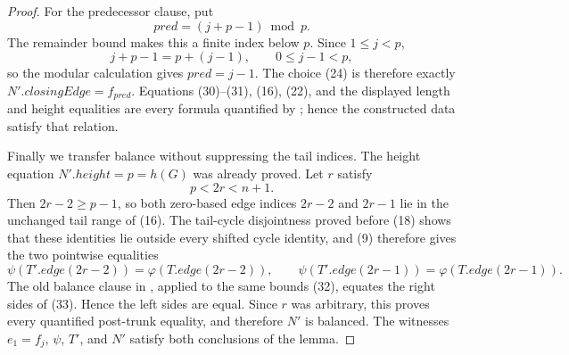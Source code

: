\begin{proof}
For the predecessor clause, put
\[
                   pred=(j+p-1)\bmod p.                          \tag{31}
\]
The remainder bound makes this a finite index below $p$.  Since
$1\leq j<p$,
\[
      j+p-1=p+(j-1),\qquad 0\leq j-1<p,
\]
so the modular calculation gives $pred=j-1$.  The choice (24) is therefore
exactly $N'.closingEdge=f_{pred}$.  Equations (30)--(31), (16), (22), and
the displayed length and height equalities are every formula quantified
by ; hence the constructed data satisfy that
relation.

Finally we transfer balance without suppressing the tail indices.  The
height equation $N'.height=p=h(G)$ was already proved.  Let $r$ satisfy
\[
                         p<2r<n+1.                               \tag{32}
\]
Then $2r-2\geq p-1$, so both zero-based edge indices $2r-2$ and $2r-1$
lie in the unchanged tail range of (16).  The tail-cycle disjointness
proved before (18) shows that these identities lie outside every shifted
cycle identity, and (9) therefore gives the two pointwise equalities
\[
 \psi(T'.edge(2r-2))=\varphi(T.edge(2r-2)),\qquad
 \psi(T'.edge(2r-1))=\varphi(T.edge(2r-1)).                      \tag{33}
\]
The old balance clause in
, applied to the same bounds (32),
equates the right sides of (33).  Hence the left sides are equal.  Since
$r$ was arbitrary, this proves every quantified post-trunk equality, and
therefore $N'$ is balanced.  The witnesses $e_1=f_j$, $\psi$, $T'$, and
$N'$ satisfy both conclusions of the lemma.
\end{proof}

